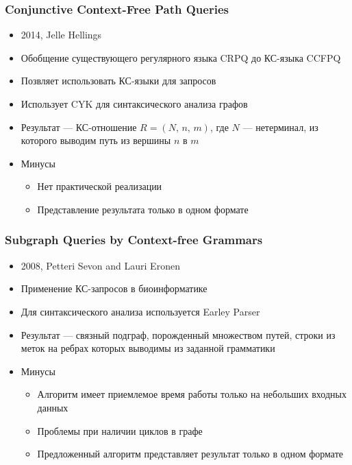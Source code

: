 \documentclass{beamer}
\begin{document}
\begin{frame}
  \transwipe[direction=90]
  \frametitle{Conjunctive Context-Free Path Queries}
  \begin{itemize}
    \item 2014, Jelle Hellings
    \item Обобщение существующего регулярного языка CRPQ до КС-языка CCFPQ
    \item Позвляет использовать КС-языки для запросов
    \item Использует CYK для синтаксического анализа графов
    \item Результат --- КС-отношение \(R = (N,\, n,\, m)\), где \(N\) --- нетерминал, из которого выводим путь из вершины \(n\) в \(m\)
  \end{itemize}
  
  \begin{itemize}
    \item Минусы
    \begin{itemize}
      \item Нет практической реализации
      \item Представление результата только в одном формате
    \end{itemize}
  \end{itemize}
\end{frame}

\begin{frame}
  \transwipe[direction=90]
  \frametitle{Subgraph Queries by Context-free Grammars}
  \begin{itemize}
    \item 2008, Petteri Sevon and Lauri Eronen
    \item Применение КС-запросов в биоинформатике
    \item Для синтаксического анализа используется Earley Parser 
    \item Результат --- связный подграф, порожденный множеством путей, строки из меток на ребрах которых выводимы из заданной грамматики
  \end{itemize}
  
  \begin{itemize}
    \item Минусы
    \begin{itemize}
      \item Алгоритм имеет приемлемое время работы только на небольших входных данных
      \item Проблемы при наличии циклов в графе
      \item Предложенный алгоритм представляет результат только в одном формате
    \end{itemize}
  \end{itemize}
\end{frame}
\end{document}
